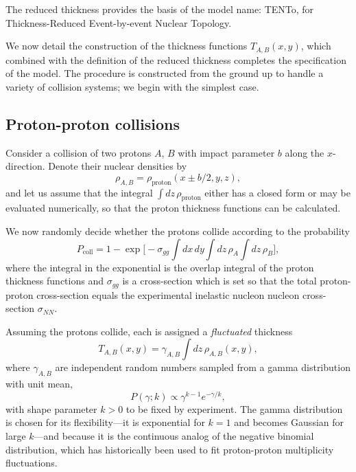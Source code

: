 \documentclass[aps,prl,reprint,amsmath,nofootinbib]{revtex4-1}
\begin{document}
The reduced thickness provides the basis of the model name:
T\raisebox{-.5ex}{R}ENTo, for Thickness-Reduced Event-by-event Nuclear Topology.

We now detail the construction of the thickness functions $T_{A,B}(x, y)$, which combined with the definition
of the reduced thickness completes the specification of the model.  The procedure is constructed from the
ground up to handle a variety of collision systems; we begin with the simplest case.

\subsection{Proton-proton collisions}

Consider a collision of two protons $A$, $B$ with impact parameter $b$ along the $x$-direction.
Denote their nuclear densities by
\begin{equation*}
  \rho_{A,B} = \rho_\text{proton}(x \pm b/2, y, z),
\end{equation*}
and let us assume that the integral $\int dz \, \rho_\text{proton}$ either has a closed form or may be
evaluated numerically, so that the proton thickness functions can be calculated.

We now randomly decide whether the protons collide according to the probability
\begin{equation}
  P_\text{coll} = 1 - \exp\biggl[ -\sigma_{gg} \int dx \, dy \int dz \, \rho_A \int dz \, \rho_B \biggr],
\end{equation}
where the integral in the exponential is the overlap integral of the proton thickness functions and
$\sigma_{gg}$ is a cross-section which is set so that the total proton-proton cross-section equals the
experimental inelastic nucleon nucleon cross-section $\sigma_{NN}$.

Assuming the protons collide, each is assigned a \emph{fluctuated} thickness
\begin{equation}
  T_{A,B}(x, y) = \gamma_{A,B} \int dz \, \rho_{A,B}(x, y),
\end{equation}
where $\gamma_{A,B}$ are independent random numbers sampled from a gamma distribution with unit mean,
\begin{equation}
  P(\gamma; k) \propto \gamma^{k-1} e^{-\gamma/k},
\end{equation}
with shape parameter $k > 0$ to be fixed by experiment.  The gamma distribution is chosen for its
flexibility---it is exponential for $k = 1$ and becomes Gaussian for large $k$---and because it is the
continuous analog of the negative binomial distribution, which has historically been used to fit proton-proton
multiplicity fluctuations.
\end{document}
